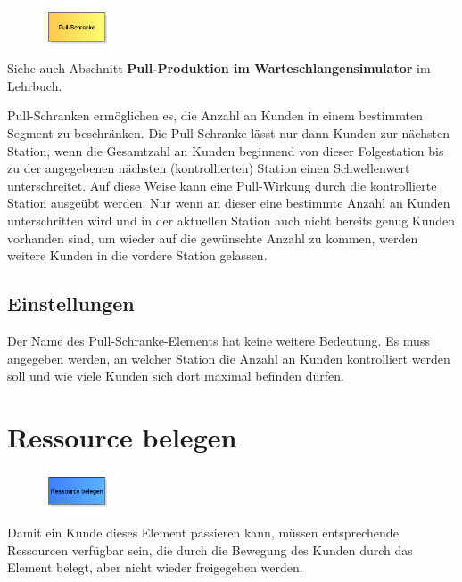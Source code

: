 \begin{figure}
\vspace{-22pt}
\includegraphics[width=2cm]{imageModelElementBarrierPull.png}
\vspace{-22pt}
\end{figure}

Siehe auch Abschnitt \textbf{Pull-Produktion im Warteschlangensimulator} im Lehrbuch.

Pull-Schranken ermöglichen es, die Anzahl an Kunden in einem bestimmten Segment
zu beschränken. Die Pull-Schranke lässt nur dann Kunden zur nächsten Station,
wenn die Gesamtzahl an Kunden beginnend von dieser Folgestation bis zu der angegebenen
nächsten (kontrollierten) Station einen Schwellenwert unterschreitet. Auf diese Weise
kann eine Pull-Wirkung durch die kontrollierte Station ausgeübt werden: Nur wenn an
dieser eine bestimmte Anzahl an Kunden unterschritten wird und in der aktuellen Station
auch nicht bereits genug Kunden vorhanden sind, um wieder auf die gewünschte Anzahl
zu kommen, werden weitere Kunden in die vordere Station gelassen.

\subsection*{Einstellungen}

Der Name des Pull-Schranke-Elements hat keine weitere Bedeutung. Es muss angegeben
werden, an welcher Station die Anzahl an Kunden kontrolliert werden soll und wie
viele Kunden sich dort maximal befinden dürfen.


\section{Ressource belegen}
\label{ref:ModelElementSeize}

\begin{figure}
\vspace{-22pt}
\includegraphics[width=2cm]{imageModelElementSeize.png}
\vspace{-22pt}
\end{figure}

Damit ein Kunde dieses Element passieren kann, müssen entsprechende Ressourcen verfügbar sein, die durch die Bewegung des
Kunden durch das Element belegt, aber nicht wieder freigegeben werden.

